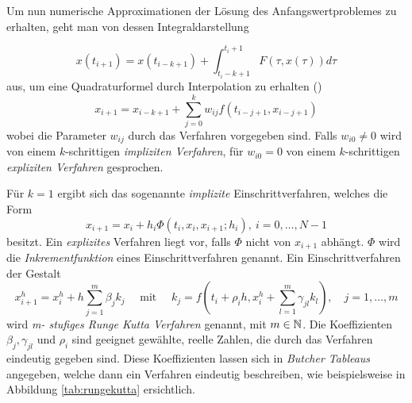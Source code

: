 Um nun numerische Approximationen der Lösung des Anfangswertproblemes zu erhalten, geht man von dessen Integraldarstellung 

\[
 x(t_{i+1}) = x(t_{i-k+1}) + \int_{t_i-k+1}^{t_i+1} F(\tau,x(\tau))d\tau
\]
aus, um eine Quadraturformel durch Interpolation zu erhalten (\cite[(1.55)]{hermann2004numerik})
\[
 x_{i+1} = x_{i-k+1} + \sum_{j=0}^k w_{ij} f(t_{i-j+1},x_{i-j+1})
\]
wobei die Parameter $w_{ij}$ durch das Verfahren vorgegeben sind. Falls $w_{i0}\neq 0$ wird von einem $k$-schrittigen \textit{impliziten Verfahren}, für $w_{i0} = 0$ von einem $k$-schrittigen \textit{expliziten Verfahren} gesprochen.

Für $k=1$ ergibt sich das sogenannte \textit{implizite} Einschrittverfahren, welches die Form
\[
 x_{i+1} = x_i + h_i \Phi (t_i,x_i,x_{i+1};h_i), ~ i=0,\ldots, N-1
\]
besitzt.
Ein \textit{explizites} Verfahren liegt vor, falls $\Phi$ nicht von $x_{i+1}$ abhängt. $\Phi$ wird die \textit{Inkrementfunktion} eines Einschrittverfahren genannt.
Ein Einschrittverfahren der Gestalt 
\[
 x_{i+1}^h = x_i^h + h\sum_{j=1}^m \beta_j k_j \quad \text{ mit } \quad k_j  = f(t_i+ \rho_ih, x_i^h + \sum_{l=1}^m \gamma_{jl} k_l ), \quad j=1,\ldots,m
\]
wird \textit{m- stufiges Runge Kutta Verfahren} genannt, mit $m\in \mathbb{N}$. Die Koeffizienten $\beta_j,\gamma_{jl}$ und $\rho_i$ sind geeignet gewählte, reelle Zahlen, die durch das Verfahren eindeutig gegeben sind. Diese Koeffizienten lassen sich in \textit{Butcher Tableaus} angegeben, welche dann ein Verfahren eindeutig beschreiben, wie beispielsweise in Abbildung \ref{tab:rungekutta} ersichtlich.

